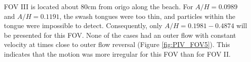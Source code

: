 \documentclass[a4paper, 11pt, english, twoside, openright]{article}
\begin{document}
 FOV III is located about 80cm from origo along the beach. For $A/H=0.0989$ and $A/H=0.1191$, the swash tongues were too thin, and particles within the tongue were impossible to detect. Consequently, only $A/H=0.1981-0.4874$ will be presented for this FOV. None of the cases had an outer flow with constant velocity at times close to outer flow reversal (Figure \ref{fig:PIV_FOV5}). This indicates that the motion was more irregular for this FOV than for FOV II.
 \begin{figure}[]
\centering
{}
\end{figure}
\end{document}

